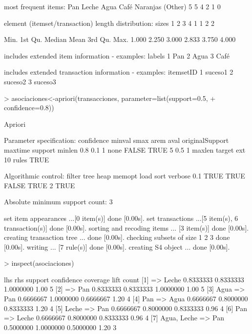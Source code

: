 \documentclass[a4paper, 12pt]{article}
\begin{document}
\begin{itemize}
\begin{Schunk}
\begin{Soutput}
most frequent items:
     Pan    Leche     Agua     Café Naranjas  (Other) 
       5        5        4        2        1        0 

element (itemset/transaction) length distribution:
sizes
1 2 3 4 
1 1 2 2 

   Min. 1st Qu.  Median    Mean 3rd Qu.    Max. 
  1.000   2.250   3.000   2.833   3.750   4.000 

includes extended item information - examples:
  labels
1    Pan
2   Agua
3   Café

includes extended transaction information - examples:
  itemsetID
1   suceso1
2   suceso2
3   suceso3
\end{Soutput}
\begin{Sinput}
> asociaciones<-apriori(transacciones, parameter=list(support=0.5,
+ confidence=0.8))
\end{Sinput}
\begin{Soutput}
Apriori

Parameter specification:
 confidence minval smax arem  aval originalSupport maxtime support minlen
        0.8    0.1    1 none FALSE            TRUE       5     0.5      1
 maxlen target  ext
     10  rules TRUE

Algorithmic control:
 filter tree heap memopt load sort verbose
    0.1 TRUE TRUE  FALSE TRUE    2    TRUE

Absolute minimum support count: 3 

set item appearances ...[0 item(s)] done [0.00s].
set transactions ...[5 item(s), 6 transaction(s)] done [0.00s].
sorting and recoding items ... [3 item(s)] done [0.00s].
creating transaction tree ... done [0.00s].
checking subsets of size 1 2 3 done [0.00s].
writing ... [7 rule(s)] done [0.00s].
creating S4 object  ... done [0.00s].
\end{Soutput}
\begin{Sinput}
> inspect(asociaciones)
\end{Sinput}
\begin{Soutput}
    lhs              rhs     support   confidence coverage  lift count
[1] {}            => {Leche} 0.8333333 0.8333333  1.0000000 1.00 5    
[2] {}            => {Pan}   0.8333333 0.8333333  1.0000000 1.00 5    
[3] {Agua}        => {Pan}   0.6666667 1.0000000  0.6666667 1.20 4    
[4] {Pan}         => {Agua}  0.6666667 0.8000000  0.8333333 1.20 4    
[5] {Leche}       => {Pan}   0.6666667 0.8000000  0.8333333 0.96 4    
[6] {Pan}         => {Leche} 0.6666667 0.8000000  0.8333333 0.96 4    
[7] {Agua, Leche} => {Pan}   0.5000000 1.0000000  0.5000000 1.20 3    
\end{Soutput}
\end{Schunk}
	\end{itemize}
\end{document}
